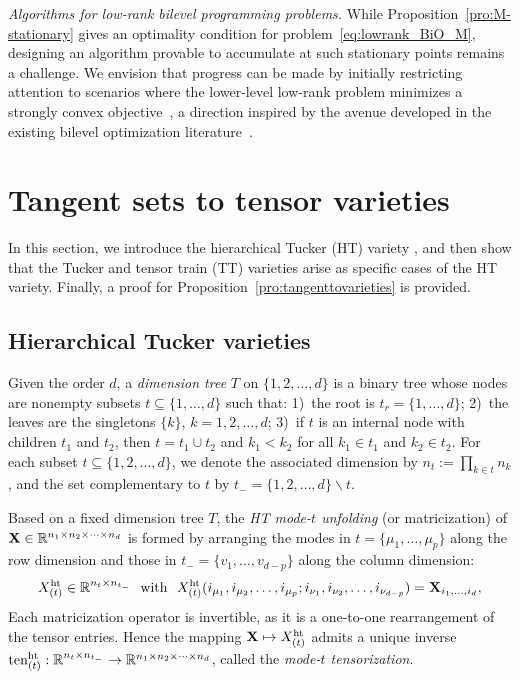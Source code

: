 \emph{Algorithms for low-rank bilevel programming problems.} While Proposition~\ref{pro:M-stationary} gives an optimality condition for problem~\eqref{eq:lowrank_BiO_M}, designing an algorithm provable to accumulate at such stationary points remains a challenge. We envision that progress can be made by initially restricting attention to scenarios where the lower-level low-rank problem minimizes a strongly convex objective~\cite{park2018findingefficiently}, a direction inspired by the avenue developed in the existing bilevel optimization literature~\cite{ghadimi2018approximation}.




\appendix

\normalsize

\section{Tangent sets to tensor varieties}\label{app:tensorvariety}
In this section, we introduce the hierarchical Tucker (HT) variety \cite{hackbusch2009newHT,grasedyck2010hierarchicalSVD}, and then show that the Tucker and tensor train (TT) varieties \cite{tucker1964extension,oseledets2011TTSVD} arise as specific cases of the HT variety. Finally, a proof for Proposition~\ref{pro:tangenttovarieties} is provided.




\subsection{Hierarchical Tucker varieties}\label{app:HTvariety}
Given the order $d$, a \emph{dimension tree} $T$ on $\{1,2,\ldots,d\}$ is a binary tree whose nodes are nonempty subsets $t\subseteq\{1,\ldots,d\}$ such that: 1)~the root is $t_r=\{1,\ldots,d\}$; 2)~the leaves are the singletons $\{k\}$, $k=1,2,\ldots,d$; 3)~if $t$ is an internal node with children $t_1$ and $t_2$, then $t=t_1\cup t_2$ and $k_1<k_2$ for all $k_1\in t_1$ and $k_2\in t_2$. For each subset $t\subseteq\{1,2,\ldots,d\}$, we denote the associated dimension by $n_t:=\prod_{k\in t}n_k$, and the set complementary to $t$ by $t_{-}=\{1,2,\ldots,d\} \backslash t$.

Based on a fixed dimension tree $T$, the \emph{HT mode-$t$ unfolding} (or matricization) of $\mathbf{X}\in\mathbb{R}^{n_1\times n_2\times\cdots\times n_d}$ is formed by arranging the modes in $t=\{\mu_1,\ldots,\mu_p\}$ along the row dimension and those in $t_-=\{v_1,\ldots,v_{d-p}\}$ along the column dimension:
$$
X^{\mathrm{ht}}_{(t)} \in \mathbb{R}^{n_t\times n_{t_-}}\ \ \text {with}\ \ X^{\mathrm{ht}}_{(t)}(i_{\mu_1}, i_{\mu_2}, \ldots, i_{\mu_p};i_{\nu_1}, i_{\nu_2}, \ldots, i_{\nu_{d-p}})=\mathbf{X}_{i_1, \ldots, i_d},
$$
Each matricization operator is invertible, as it is a one-to-one rearrangement of the tensor entries. Hence the mapping $\mathbf{X} \mapsto X^{{\mathrm{ht}}}_{(t)}$ admits a unique inverse $\mathrm{ten}^{\mathrm{ht}}_{(t)}:\mathbb{R}^{n_t\times n_{t_-}}\to\mathbb{R}^{n_1\times n_2\times\cdots\times n_d}$, called the \emph{mode-$t$ tensorization}.

